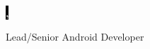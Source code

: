 \documentclass[9pt]{developercv} %
\begin{document}
 
\begin{minipage}[t]{0.45\textwidth} %
	\vspace{-\baselineskip} %
	
	\colorbox{black}{{\HUGE\textcolor{white}{\textbf{\MakeUppercase{\myname}}}}} %
	
	\colorbox{black}{{\HUGE\textcolor{white}{\textbf{\MakeUppercase{\mysurname}}}}{\huge\textcolor{white}{\textbf{, {\myqualification}}}}} %
	
	\vspace{6pt}
	
	{\huge Lead/Senior Android Developer} %
\end{minipage}
\begin{minipage}[t]{0.275\textwidth} %
	\vspace{-\baselineskip} %
	
	\\
	\\
	\\
\end{minipage}
\end{document}
